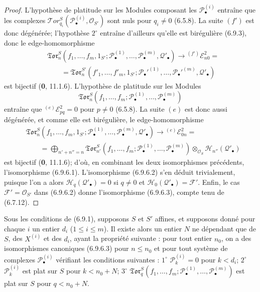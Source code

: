 \begin{proof}
L'hypothèse de platitude sur les Modules composant les
$\mathscr P_\bullet^{(i)}$ entraîne que les complexes
$\mathscr{T}\!or_{q_i}^S(\mathscr P_\bullet^{(i)},\mathscr O_{S'})$ sont nuls
pour $q_i\ne0$ (6.5.8). La suite $(f')$ est donc dégénérée; l'hypothèse
$2^\circ$ entraîne d'ailleurs qu'elle est birégulière (6.9.3), donc le
edge-homomorphisme
\[
\begin{split}
  &\mathfrak{Tor}_n^S
  (f_1,\ldots,f_m,1_{S'};
   \mathscr P_\bullet^{(1)},\ldots,
   \mathscr P_\bullet^{(m)},\mathscr Q'_\bullet)
  \longrightarrow {}^{(f')}\mathscr E_{n0}^2=\\
  &\qquad=
  \mathfrak{Tor}_n^{S'}
  (f'_1,\ldots,f'_m,1_{S'};
   \mathscr P_\bullet'^{(1)},\ldots,
   \mathscr P_\bullet'^{(m)},\mathscr Q'_\bullet)
\end{split}
\tag{6.9.6.4}\label{III.6.9.6.4.fr}
\]
est bijectif (\textbf{0}, 11.1.6). L'hypothèse de platitude sur les Modules
\[
  \mathfrak{Tor}_n^S
  (f_1,\ldots,f_m;
   \mathscr P_\bullet^{(1)},\ldots,\mathscr P_\bullet^{(m)})
\]
entraîne que ${}^{(e)}\mathscr E_{pq}^2=0$ pour $p\ne0$ (6.5.8). La suite
$(e)$ est donc aussi dégénérée, et comme elle est birégulière, le
edge-homomorphisme
\[
\begin{split}
  &\mathfrak{Tor}_n^S
  (f_1,\ldots,f_m,1_{S'};
   \mathscr P_\bullet^{(1)},\ldots,
   \mathscr P_\bullet^{(m)},\mathscr Q'_\bullet)
  \longrightarrow {}^{(e)}\mathscr E_{0n}^2=\\
  &\qquad=
  \bigoplus_{n'+n''=n}
  \mathfrak{Tor}_{n'}^S
  (f_1,\ldots,f_m;
   \mathscr P_\bullet^{(1)},\ldots,
   \mathscr P_\bullet^{(m)})
  \otimes_{\mathscr O_S}\mathscr H_{n''}(\mathscr Q'_\bullet)
\end{split}
\tag{6.9.6.5}\label{III.6.9.6.5.fr}
\]
est bijectif (\textbf{0}, 11.1.6); d'où, en combinant les deux isomorphismes
précédents, l'isomorphisme (6.9.6.1). L'isomorphisme (6.9.6.2) s'en déduit
trivialement, puisque l'on a alors
$\mathscr H_q(\mathscr Q'_\bullet)=0$ si $q\ne0$ et
$\mathscr H_0(\mathscr Q'_\bullet)=\mathscr F'$. Enfin, le cas
$\mathscr F'=\mathscr O_{S'}$ dans (6.9.6.2) donne l'isomorphisme (6.9.6.3),
compte tenu de (6.7.12).
\end{proof}

\begin{corollary}[6.9.7]
Sous les conditions de \textup{(6.9.1)}, supposons $S$ et $S'$ affines, et supposons
donné pour chaque $i$ un entier $d_i$ ($1\leq i\leq m$). Il existe alors un
entier $N$ ne dépendant que de $S$, des $X^{(i)}$ et des $d_i$, ayant la
propriété suivante : pour tout entier $n_0$, on a des isomorphismes canoniques
\textup{(6.9.6.3)} pour $n\leq n_0$ et pour tout système de complexes
$\mathscr P_\bullet^{(i)}$ vérifiant les conditions suivantes :
$1^\circ$ $\mathscr P_k^{(i)}=0$ pour $k<d_i$;
$2^\circ$ $\mathscr P_k^{(i)}$ est plat sur $S$ pour $k<n_0+N$;
$3^\circ$
$\mathfrak{Tor}_q^S(f_1,\ldots,f_m;
\mathscr P_\bullet^{(1)},\ldots,\mathscr P_\bullet^{(m)})$ est plat sur
$S$ pour $q<n_0+N$.
\end{corollary}

